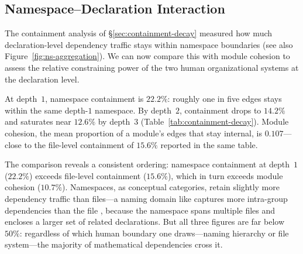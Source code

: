 \subsection{Namespace--Declaration Interaction}
\label{sec:ns-decl-interaction}

The containment analysis of \S\ref{sec:containment-decay} measured how much declaration-level dependency traffic stays within namespace boundaries (see also Figure~\ref{fig:ns-aggregation}). We can now compare this with module cohesion to assess the relative constraining power of the two human organizational systems at the declaration level.

At depth~$1$, namespace containment is $22.2\%$: roughly one in five edges stays within the same depth-$1$ namespace. By depth~$2$, containment drops to $14.2\%$ and saturates near $12.6\%$ by depth~$3$ (Table~\ref{tab:containment-decay}). Module cohesion, the mean proportion of a module's edges that stay internal, is $0.107$---close to the file-level containment of $15.6\%$ reported in the same table.

The comparison reveals a consistent ordering: namespace containment at depth~$1$ ($22.2\%$) exceeds file-level containment ($15.6\%$), which in turn exceeds module cohesion ($10.7\%$). Namespaces, as conceptual categories, retain slightly more dependency traffic than files---a naming domain like  captures more intra-group dependencies than the file , because the namespace spans multiple files and encloses a larger set of related declarations. But all three figures are far below~$50\%$: regardless of which human boundary one draws---naming hierarchy or file system---the majority of mathematical dependencies cross it.

